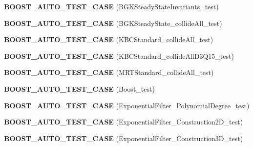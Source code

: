 \begin{DoxyCompactItemize}
\item 
\hypertarget{namespacenatrium_a5c7300f3faa06fe8d0255ec9bd267371}{
{\bfseries BOOST\_\-AUTO\_\-TEST\_\-CASE} (BGKSteadyStateInvariants\_\-test)}
\label{namespacenatrium_a5c7300f3faa06fe8d0255ec9bd267371}

\item 
\hypertarget{namespacenatrium_a157851ed45bc9df182651c6e5474a23b}{
{\bfseries BOOST\_\-AUTO\_\-TEST\_\-CASE} (BGKSteadyState\_\-collideAll\_\-test)}
\label{namespacenatrium_a157851ed45bc9df182651c6e5474a23b}

\item 
\hypertarget{namespacenatrium_a67caa76ee272bd6eff0ecf145383c8ec}{
{\bfseries BOOST\_\-AUTO\_\-TEST\_\-CASE} (KBCStandard\_\-collideAll\_\-test)}
\label{namespacenatrium_a67caa76ee272bd6eff0ecf145383c8ec}

\item 
\hypertarget{namespacenatrium_a6dbb4ae558c5145ecb8dad5917cb1739}{
{\bfseries BOOST\_\-AUTO\_\-TEST\_\-CASE} (KBCStandard\_\-collideAllD3Q15\_\-test)}
\label{namespacenatrium_a6dbb4ae558c5145ecb8dad5917cb1739}

\item 
\hypertarget{namespacenatrium_aec0de411445e92474210cf06a70e11f7}{
{\bfseries BOOST\_\-AUTO\_\-TEST\_\-CASE} (MRTStandard\_\-collideAll\_\-test)}
\label{namespacenatrium_aec0de411445e92474210cf06a70e11f7}

\item 
\hypertarget{namespacenatrium_ab123d146472bc24ce4cd36c5cb71e9a8}{
{\bfseries BOOST\_\-AUTO\_\-TEST\_\-CASE} (Boost\_\-test)}
\label{namespacenatrium_ab123d146472bc24ce4cd36c5cb71e9a8}

\item 
\hypertarget{namespacenatrium_a079786c75e31c8ceb37511575a567ba1}{
{\bfseries BOOST\_\-AUTO\_\-TEST\_\-CASE} (ExponentialFilter\_\-PolynomialDegree\_\-test)}
\label{namespacenatrium_a079786c75e31c8ceb37511575a567ba1}

\item 
\hypertarget{namespacenatrium_aa16b180ba946481bdb52b08a1c0c3d2b}{
{\bfseries BOOST\_\-AUTO\_\-TEST\_\-CASE} (ExponentialFilter\_\-Construction2D\_\-test)}
\label{namespacenatrium_aa16b180ba946481bdb52b08a1c0c3d2b}

\item 
\hypertarget{namespacenatrium_ac03a2217678ec69581c3ed15cda461df}{
{\bfseries BOOST\_\-AUTO\_\-TEST\_\-CASE} (ExponentialFilter\_\-Construction3D\_\-test)}
\label{namespacenatrium_ac03a2217678ec69581c3ed15cda461df}


\end{DoxyCompactItemize}
